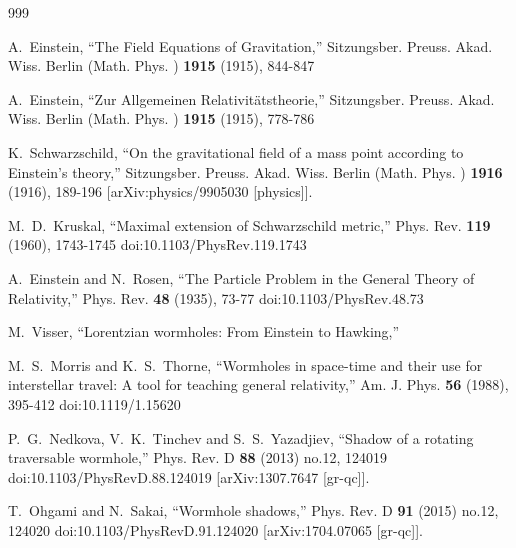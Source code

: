 \documentclass[aps,preprint,groupedaddress,nofootinbib,superscriptaddress,showkeys,showpacs,eqsecnum,amsmath,amssymb]{revtex4-1}
\begin{document}
\begin{thebibliography}{999}

A.~Einstein,
``The Field Equations of Gravitation,''
Sitzungsber. Preuss. Akad. Wiss. Berlin (Math. Phys. ) \textbf{1915} (1915), 844-847

A.~Einstein,
``Zur Allgemeinen Relativit\"atstheorie,''
Sitzungsber. Preuss. Akad. Wiss. Berlin (Math. Phys. ) \textbf{1915} (1915), 778-786

K.~Schwarzschild,
``On the gravitational field of a mass point according to Einstein's theory,''
Sitzungsber. Preuss. Akad. Wiss. Berlin (Math. Phys. ) \textbf{1916} (1916), 189-196
[arXiv:physics/9905030 [physics]].

M.~D.~Kruskal,
``Maximal extension of Schwarzschild metric,''
Phys. Rev. \textbf{119} (1960), 1743-1745
doi:10.1103/PhysRev.119.1743

A.~Einstein and N.~Rosen,
``The Particle Problem in the General Theory of Relativity,''
Phys. Rev. \textbf{48} (1935), 73-77
doi:10.1103/PhysRev.48.73

M.~Visser,
``Lorentzian wormholes: From Einstein to Hawking,''

M.~S.~Morris and K.~S.~Thorne,
``Wormholes in space-time and their use for interstellar travel: A tool for teaching general relativity,''
Am. J. Phys. \textbf{56} (1988), 395-412
doi:10.1119/1.15620

P.~G.~Nedkova, V.~K.~Tinchev and S.~S.~Yazadjiev,
``Shadow of a rotating traversable wormhole,''
Phys. Rev. D \textbf{88} (2013) no.12, 124019
doi:10.1103/PhysRevD.88.124019
[arXiv:1307.7647 [gr-qc]].

T.~Ohgami and N.~Sakai,
``Wormhole shadows,''
Phys. Rev. D \textbf{91} (2015) no.12, 124020
doi:10.1103/PhysRevD.91.124020
[arXiv:1704.07065 [gr-qc]].


\end{thebibliography}
\end{document}
